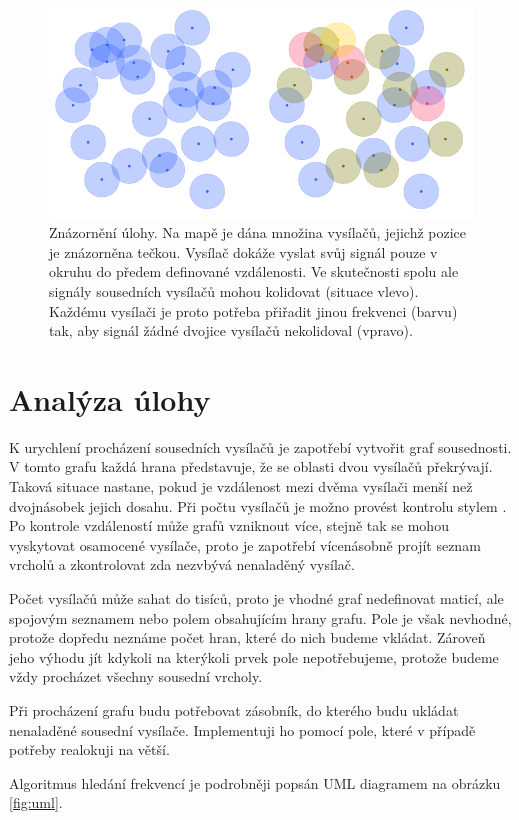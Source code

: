 \documentclass[12pt,a4paper]{article}
\begin{document}
\begin{figure}[htbp]
  \centering
    \includegraphics[width=.80\textwidth]{pics/zadaniimg.pdf}
  \caption{Znázornění úlohy. Na mapě je dána množina vysílačů, jejichž pozice je znázorněna
  tečkou. Vysílač dokáže vyslat svůj signál pouze v okruhu do předem definované vzdálenosti. Ve
  skutečnosti spolu ale signály sousedních vysílačů mohou kolidovat (situace vlevo). Každému
  vysílači je proto potřeba přiřadit jinou frekvenci (barvu) tak, aby signál žádné dvojice vysílačů
  nekolidoval (vpravo).}
  \label{fig:obrazekzezadani}
\end{figure}

\newpage
\section{Analýza úlohy}
%
K urychlení procházení sousedních vysílačů je zapotřebí vytvořit graf sousednosti. 
V tomto grafu každá hrana představuje, že se oblasti 
dvou vysílačů překrývají. Taková situace nastane, pokud je vzdálenost mezi dvěma vysílači menší než dvojnásobek
jejich dosahu. Při počtu vysílačů je možno provést kontrolu stylem . Po kontrole vzdáleností může grafů vzniknout více, 
stejně tak se mohou vyskytovat osamocené vysílače, proto je zapotřebí vícenásobně projít seznam vrcholů a zkontrolovat zda
nezvbývá nenaladěný vysílač.

Počet vysílačů může sahat do tisíců, proto je vhodné graf nedefinovat maticí, 
ale spojovým seznamem nebo polem obsahujícím hrany grafu. Pole je však nevhodné, 
protože dopředu neznáme počet hran, které do nich budeme vkládat. Zároveň jeho výhodu
jít kdykoli na kterýkoli prvek pole nepotřebujeme, protože budeme vždy procházet 
všechny sousední vrcholy.

Při procházení grafu budu potřebovat zásobník, do kterého budu ukládat nenaladěné 
sousední vysílače. Implementuji ho pomocí pole, které v případě potřeby realokuji na větší.

Algoritmus hledání frekvencí je podrobněji popsán UML diagramem na obrázku \ref{fig:uml}.
\end{document}
